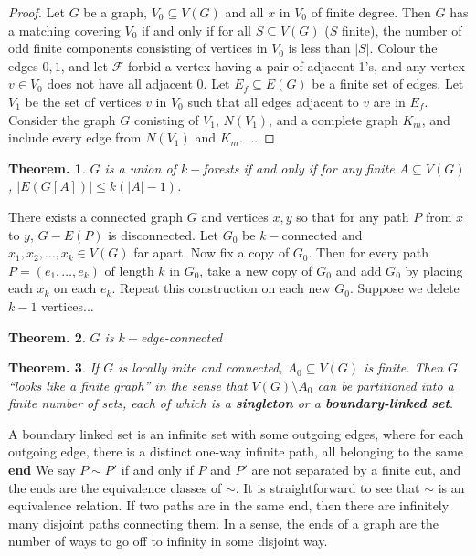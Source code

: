 \documentclass[11pt, a4paper]{memoir}
\theoremstyle{change}
\newtheorem{theorem}{Theorem.}[section]
\theoremstyle{plain}
\theoremstyle{nonumberplain}
\newtheorem{proof}{Proof}
\numberwithin{equation}{section}
\begin{document}
\begin{proof}
    Let $G$ be a graph, $V_0\subseteq V(G)$ and all $x$ in $V_0$ of finite degree.
    Then $G$ has a matching covering $V_0$ if and only if for all $S\subseteq V(G)$ ($S$ finite), the number of odd finite components consisting of vertices in $V_0$ is less than $|S|$.
    Colour the edges $0,1$, and let $\mathcal{F}$ forbid a vertex having a pair of adjacent 1's, and any vertex $v\in V_0$ does not have all adjacent $0$.
    Let $E_f\subseteq E(G)$ be a finite set of edges.
    Let $V_1$ be the set of vertices $v$ in $V_0$ such that all edges adjacent to $v$ are in $E_f$.
    Consider the graph $G$ conisting of $V_1$, $N(V_1)$, and a complete graph $K_m$, and include every edge from $N(V_1)$ and $K_m$.
    ...
\end{proof}
\begin{theorem}
    $G$ is a union of $k-$forests if and only if for any finite $A\subseteq V(G)$, $|E(G[A])|\leq k(|A|-1)$.
\end{theorem}
There exists a connected graph $G$ and vertices $x,y$ so that for any path $P$ from $x$ to $y$, $G-E(P)$ is disconnected.
Let $G_0$ be $k-$connected and $x_1,x_2,\ldots,x_k\in V(G)$ far apart.
Now fix a copy of $G_0$.
Then for every path $P=(e_1,\ldots,e_k)$ of length $k$ in $G_0$, take a new copy of $G_0$ and add $G_0$ by placing each $x_k$ on each $e_k$.
Repeat this construction on each new $G_0$.
Suppose we delete $k-1$ vertices...
\begin{theorem}
    $G$ is $k-$edge-connected
\end{theorem}
\begin{theorem}
    If $G$ is locally inite and connected, $A_0\subseteq V(G)$ is finite.
    Then $G$ ``looks like a finite graph'' in the sense that $V(G)\setminus A_0$ can be partitioned into a finite number of sets, each of which is a \textbf{singleton} or a \textbf{boundary-linked set}.
\end{theorem}
A boundary linked set is an infinite set with some outgoing edges, where for each outgoing edge, there is a distinct one-way infinite path, all belonging to the same \textbf{end}
We say $P\sim P'$ if and only if $P$ and $P'$ are not separated by a finite cut, and the ends are the equivalence classes of $\sim$.
It is straightforward to see that $\sim$ is an equivalence relation.
If two paths are in the same end, then there are infinitely many disjoint paths connecting them.
In a sense, the ends of a graph are the number of ways to go off to infinity in some disjoint way.
\end{document}
